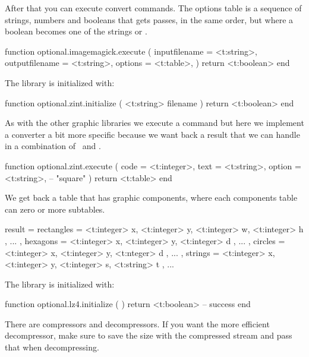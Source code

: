 After that you can execute convert commands. The options table is a sequence of
strings, numbers and booleans that gets passes, in the same order, but where a
boolean becomes one of the strings  or .

\starttyping[option=LUA]
function optional.imagemagick.execute (
    {
        inputfilename  = <t:string>,
        outputfilename = <t:string>,
        options        = <t:table>,
    }
)
    return <t:boolean>
end
\stoptyping

\stopsubsubsubject

\startsubsubsubject[title=zint]

The  library is initialized with:

\starttyping[option=LUA]
function optional.zint.initialize ( <t:string> filename )
    return <t:boolean>
end
\stoptyping

As with the other graphic libraries we execute a command but here we implement a
converter a bit more specific because we want back a result that we can handle in
a combination of \TEX\ and \METAPOST.

\starttyping[option=LUA]
function optional.zint.execute (
    {
        code   = <t:integer>,
        text   = <t:string>,
        option = <t:string>, -- "square"
    }
)
    return <t:table>
end
\stoptyping

We get back a table that has graphic components, where each components table can
zero or more subtables.

\starttyping[option=LUA]
result = {
    rectangles = {
        { <t:integer> x, <t:integer> y, <t:integer> w, <t:integer> h }, ...
    },
    hexagons = {
        { <t:integer> x, <t:integer> y, <t:integer> d }, ...
    },
    circles = {
        { <t:integer> x, <t:integer> y, <t:nteger> d }, ...
    },
    strings = {
        { <t:integer> x, <t:integer> y, <t:integer> s, <t:string> t }, ...
    }
}
\stoptyping

\stopsubsubsubject

\stopsubsection

\startsubsection[title=Compression]

\startsubsubsubject[title=lz4]

The library is initialized with:

\starttyping[option=LUA]
function optional.lz4.initialize ( )
    return <t:boolean> -- success
end
\stoptyping

There are compressors and decompressors. If you want the more efficient
decompressor, make sure to save the size with the compressed stream and pass that
when decompressing.

